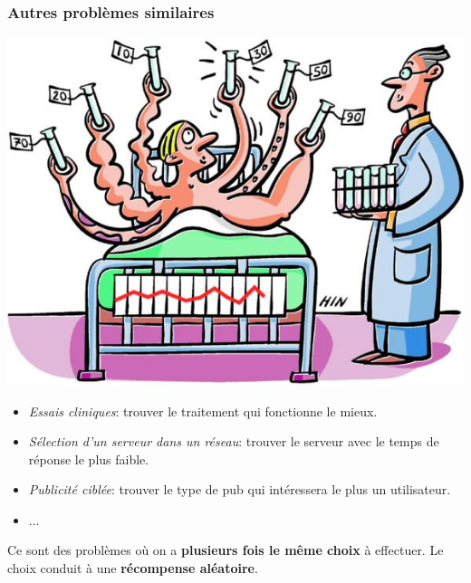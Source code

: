 \documentclass[compress, color = usenames, dvipsnames]{beamer}
\begin{document}
\begin{frame}
    \frametitle{Autres problèmes similaires}
    \begin{center}
        \includegraphics[scale=0.8]{figs/essai_clinique.jpg}
    \end{center}
    \begin{itemize}
        \item \textit{Essais cliniques}: trouver le traitement qui fonctionne le mieux.
        \item \textit{Sélection d'un serveur dans un réseau}: trouver le serveur avec le temps de réponse le plus faible.
        \item \textit{Publicité ciblée}: trouver le type de pub qui intéressera le plus un utilisateur.
        \item ...
    \end{itemize}
    Ce sont des problèmes où on a \textbf{plusieurs fois le même choix} à effectuer. Le choix conduit à une \textbf{récompense aléatoire}.
\end{frame}
\end{document}
